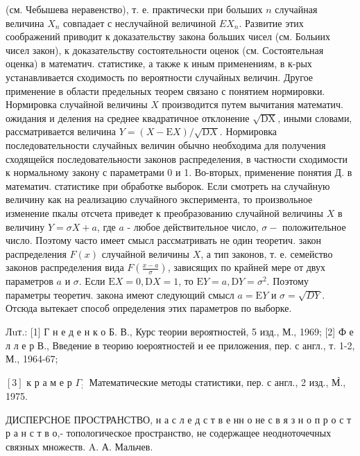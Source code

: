 \documentclass[10pt]{article}
\begin{document}
(см. Чебышева неравенство), т. е. практически при больших $n$ случайная величина $X_{n}$ совпадает с неслучайной величиной $E X_{n}$. Развитие этих соображений приводит к доказательству закона больших чисел (см. Больиих чисел закон), к доказательству состоятельности оценок (см. Состоятельная оценка) в математич. статистике, а также к иным применениям, в к-рых устанавливается сходимость по вероятности случайных величин. Другое применение в области предельных теорем связано с понятием нормировки. Нормировка случайной величины $X$ производится путем вычитания математич. ожидания и деления на среднее квадратичное отклонение $\sqrt{\mathrm{DX}}$, иными словами, рассматривается величина $Y=(X-\mathrm{E} X) / \sqrt{\mathrm{D} X}$. Нормировка последовательности случайных величин обычно необходима для получения сходящейся последовательности законов распределения, в частности сходимости к нормальному закону с параметрами 0 и 1. Во-вторых, применение понятия Д. в математич. статистике при обработке выборок. Если смотреть на случайную величину как на реализацию случайного эксперимента, то произвольное изменение пкалы отсчета приведет к преобразованию случайной величины $X$ в величину $Y=\sigma X+a$, где $a$ - любое действительное число, $\sigma-$ положительное число. Поэтому часто имеет смысл рассматривать не один теоретич. закон распределения $F(x)$ случайной величины $X$, а тип законов, т. е. семейство законов распределения вида $F\left(\frac{x-a}{\sigma}\right)$, зависящих по крайней мере от двух параметров $a$ и $\sigma$. Если $\mathrm{E} X=0, \mathrm{D} X=1$, то $\mathrm{E} Y=a, \mathrm{D} Y=\sigma^{2}$. Поэтому параметры теоретич. закона имеют следующий смысл $a=\mathrm{E} Y$ и $\sigma=\sqrt{D Y}$. Отсюда вытекает способ определения этих параметров по выборке.



Лuт.: [1] Г н е д е н к о Б. В., Курс теории вероятностей, 5 изд., М., 1969; [2] Ф е л л е р В., Введение в теорию юероятностей и ее приложения, пер. с англ., т. 1-2, М., 1964-67;

$[3]$ к р а м е р $\Gamma_{\text {; }}$ Математические методы статистики, пер. с англ., 2 изд., М̀., 1975.



ДИСПЕРСНОЕ ПРОСТРАНСТВО, н а с л е д с т в е нн о не с в я з н о п р о с т р а н с т в о,- топологическое пространство, не содержащее неодноточечных связных множеств. A. А. Мальчев.
\end{document}
